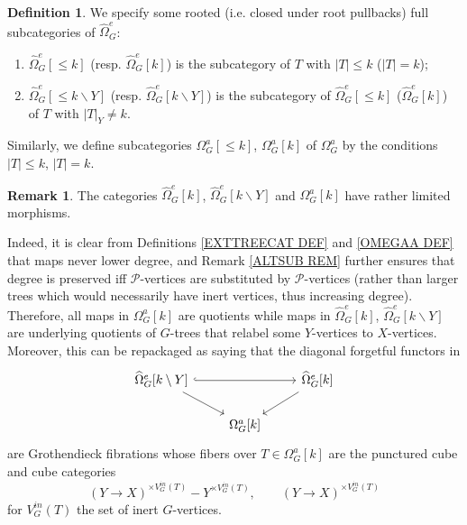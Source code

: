 \documentclass[a4paper,10pt
,draft
]{article}%
\numberwithin{equation}{section}
\numberwithin{figure}{section}
\theoremstyle{definition} %
\newtheorem{definition}[equation]{Definition}%
\newtheorem{remark}[equation]{Remark}%
\newcommand{\1}{\ensuremath{\mathbbm 1}}%
\begin{document}
\begin{definition}\label{TREE_FILTRATION_PIECES_DEFINITION}
We specify some rooted (i.e. closed under root pullbacks)
full subcategories
 of $\widehat{\Omega}_{G}^e$: 
  \begin{enumerate}
  \item $\widehat{\Omega}_G^e[\leq\! k]$ 
  (resp. $\widehat{\Omega}_G^e[k]$) is the subcategory of $T$ with $|T|\leq k$ ($|T| = k$);
  \item $\widehat{\Omega}_G^e[\leq\! k \mathbin{\backslash} Y]$
  (resp. $\widehat{\Omega}_G^e[k \mathbin{\backslash} Y]$) is the subcategory of $\widehat{\Omega}_G^e[\leq\! k]$ 
  ($\widehat{\Omega}_G^e[k]$) of $T$ with $|T|_{Y}\neq k$.
  \end{enumerate}
Similarly, we define subcategories 
$\Omega_G^a[\leq \! k]$, 
$\Omega_G^a[k]$ of $\Omega_G^a$
by the conditions $|T|\leq k$, $|T|=k$.
\end{definition}


\begin{remark}\label{LIMMOR REM}
  The categories 
  $\widehat{\Omega}_G^e[k]$, $\widehat{\Omega}_G^e[k \mathbin{\backslash} Y]$ and $\Omega_G^a[k]$
  have rather limited morphisms.
  
Indeed, it is clear from Definitions 
\ref{EXTTREECAT DEF} and \ref{OMEGAA DEF} 
that maps never lower degree,
and Remark \ref{ALTSUB REM} further ensures that degree is preserved iff
$\mathcal{P}$-vertices are substituted by $\mathcal{P}$-vertices (rather than larger trees
which would necessarily have inert vertices, thus increasing degree).
Therefore, all maps in $\Omega_G^a[k]$ are quotients while maps in $\widehat{\Omega}_G^e[k]$, $\widehat{\Omega}_G^e[k \mathbin{\backslash} Y]$
are underlying quotients of $G$-trees that 
relabel some $Y$-vertices to $X$-vertices.  
 Moreover, this can be repackaged as saying that 
  the diagonal forgetful functors in
\[
\begin{tikzcd}
  \widehat\Omega_G^e[k \mathbin{\backslash} Y] \arrow[dr] \arrow[rr, hookrightarrow] 
  && \widehat\Omega_G^e[k] \arrow[dl]\\
  & \Omega_G^a[k]
\end{tikzcd}
\]  
 are Grothendieck fibrations whose fibers over 
 $T \in \Omega_G^a[k]$
 are the punctured cube and cube categories
\begin{equation}\label{PUNCUBE EQ}
	(Y \to X)^{\times V_G^{in}(T)} - Y^{\times  V_G^{in}(T)},
\qquad
	(Y \to X)^{\times V_G^{in}(T)}
\end{equation}
for $V_G^{in}(T)$ the set of inert $G$-vertices.
\end{remark}
\end{document}
